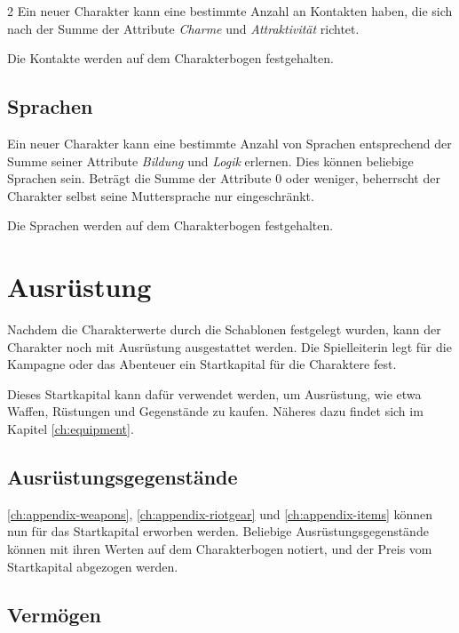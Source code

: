 \begin{multicols}{2}
Ein neuer Charakter kann eine bestimmte Anzahl an Kontakten haben, die sich nach der Summe der Attribute \textit{Charme} und \textit{Attraktivität} richtet.

Die Kontakte werden auf dem Charakterbogen festgehalten.

\subsection{Sprachen}

Ein neuer Charakter kann eine bestimmte Anzahl von Sprachen entsprechend der Summe seiner Attribute \textit{Bildung} und \textit{Logik} erlernen. Dies können beliebige Sprachen sein. Beträgt die Summe der Attribute 0 oder weniger, beherrscht der Charakter selbst seine Muttersprache nur eingeschränkt.

Die Sprachen werden auf dem Charakterbogen festgehalten.

\section{Ausrüstung}

Nachdem die Charakterwerte durch die Schablonen festgelegt wurden, kann der Charakter noch mit Ausrüstung ausgestattet werden. Die Spielleiterin legt für die Kampagne oder das Abenteuer ein Startkapital für die Charaktere fest.


Dieses Startkapital kann dafür verwendet werden, um Ausrüstung, wie etwa Waffen, Rüstungen und Gegenstände zu kaufen. Näheres dazu findet sich im Kapitel \cref{ch:equipment}.

\subsection{Ausrüstungsgegenstände}

\cref{ch:appendix-weapons}, \cref{ch:appendix-riotgear} und \cref{ch:appendix-items} können nun für das Startkapital erworben werden. Beliebige Ausrüstungsgegenstände können mit ihren Werten auf dem Charakterbogen notiert, und der Preis vom Startkapital abgezogen werden.

\subsection{Vermögen}


\end{multicols}
